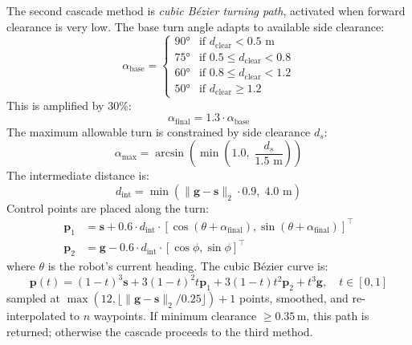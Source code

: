 \documentclass[lettersize,journal]{IEEEtran}
\begin{document}
The second cascade method is \textit{cubic Bézier turning path}, activated 
when forward clearance is very low. The base turn angle adapts to available 
side clearance:
\begin{equation}
  \alpha_{\mathrm{base}} = \begin{cases}
    90° & \text{if } d_{\mathrm{clear}} < 0.5\text{ m} \\
    75° & \text{if } 0.5 \le d_{\mathrm{clear}} < 0.8 \\
    60° & \text{if } 0.8 \le d_{\mathrm{clear}} < 1.2 \\
    50° & \text{if } d_{\mathrm{clear}} \ge 1.2
  \end{cases}
  \label{eq:turn_angle_adapt}
\end{equation}
This is amplified by $30\%$:
\begin{equation}
  \alpha_{\mathrm{final}} = 1.3 \cdot \alpha_{\mathrm{base}}
  \label{eq:turn_angle_amplified}
\end{equation}
The maximum allowable turn is constrained by side clearance $d_s$:
\begin{equation}
  \alpha_{\max} = \arcsin\!\left(\min\!\left(1.0,\;
                \frac{d_s}{1.5\text{ m}}\right)\right)
  \label{eq:turn_angle_constrain}
\end{equation}
The intermediate distance is:
\begin{equation}
  d_{\mathrm{int}} = \min\!\left(\|\mathbf{g}-\mathbf{s}\|_2 \cdot 0.9,\;
                                 4.0\text{ m}\right)
  \label{eq:intermediate_dist}
\end{equation}
Control points are placed along the turn:
\begin{align}
  \mathbf{p}_1 &= \mathbf{s} + 0.6 \cdot d_{\mathrm{int}} \cdot
                 [\cos(\theta + \alpha_{\mathrm{final}}),
                  \sin(\theta + \alpha_{\mathrm{final}})]^\top
                 \label{eq:cp1_turn} \\
  \mathbf{p}_2 &= \mathbf{g} - 0.6 \cdot d_{\mathrm{int}} \cdot
                 [\cos\phi, \sin\phi]^\top
                 \label{eq:cp2_turn}
\end{align}
where $\theta$ is the robot's current heading. The cubic Bézier curve is:
\begin{equation}
  \mathbf{p}(t) = (1-t)^3\mathbf{s} + 3(1-t)^2 t \mathbf{p}_1 +
                  3(1-t)t^2\mathbf{p}_2 + t^3\mathbf{g},
  \quad t \in [0,1]
  \label{eq:cubic_bezier_turn}
\end{equation}
sampled at $\max(12, \lfloor \|\mathbf{g}-\mathbf{s}\|_2 / 0.25 \rfloor) + 1$ 
points, smoothed, and re-interpolated to $n$ waypoints. If minimum clearance 
$\geq 0.35$\,m, this path is returned; otherwise the cascade proceeds to the 
third method.
\end{document}
